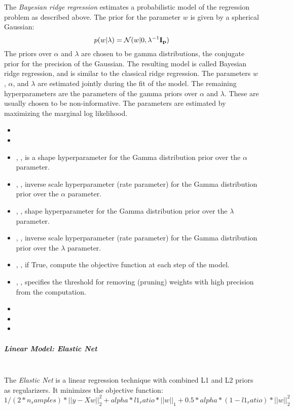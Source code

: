 The \textit{Bayesian ridge regression} estimates a probabilistic model of the
regression problem as described above.
%
The prior for the parameter $w$ is given by a spherical Gaussian:
\begin{equation}
p(w|\lambda) =\mathcal{N}(w|0,\lambda^{-1}\bold{I_{p}})
\end{equation}
The priors over $\alpha$ and $\lambda$ are chosen to be gamma distributions, the
conjugate prior for the precision of the Gaussian.
%
The resulting model is called Bayesian ridge regression, and is similar to the
classical ridge regression.
%
The parameters $w$, $\alpha$, and $\lambda$ are estimated jointly during the fit
of the model.
%
The remaining hyperparameters are the parameters of the gamma priors over
$\alpha$ and $\lambda$.
%
These are usually chosen to be non-informative.
%
The parameters are estimated by maximizing the marginal log likelihood.
%
\begin{itemize}
  \item {}
  \item {}
  \item {}, , is a shape
  hyperparameter for the Gamma distribution prior over the $\alpha$ parameter.
  \item {}, , inverse scale
  hyperparameter (rate parameter) for the Gamma distribution prior over the
  $\alpha$ parameter.
  \item {}, , shape
  hyperparameter for the Gamma distribution prior over the $\lambda$ parameter.
  \item {}, , inverse scale
  hyperparameter (rate parameter) for the Gamma distribution prior over the
  $\lambda$ parameter.
  \item {}, , if True,
  compute the objective function at each step of the model.
  \item {}, , specifies
  the threshold for removing (pruning) weights with high precision from the
  computation.
  \item {}
  \item {}
  \item {}
\end{itemize}
\subparagraph{Linear Model: Elastic Net}
\mbox{}
\\The \textit{Elastic Net} is a linear regression technique with combined L1 and
L2 priors as regularizers.
%
It minimizes the objective function:
\begin{equation}
1/(2*n_samples) *||y - Xw||^2_2+alpha*l1_ratio*||w||_1 + 0.5 *alpha*(1 - l1_ratio)*||w||^2_2
\end{equation}

